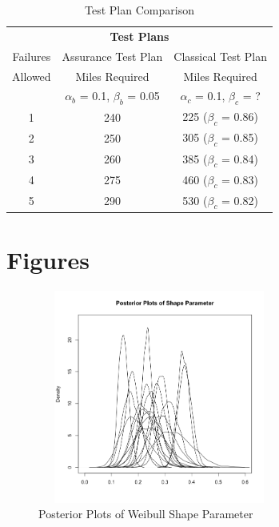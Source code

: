 \documentclass[12pt]{article}
\begin{document}
\begin{table}[H]
\center
\begin{tabular}{|c|c|c|}
\multicolumn{3}{c}{\textbf{Test Plans}} \\
\cline{1-3}
Failures & Assurance Test Plan & Classical Test Plan \\
Allowed & Miles Required & Miles Required \\
  & $\alpha_b$ = 0.1, $\beta_b$ = 0.05 & $\alpha_c$ = 0.1, $\beta_c$ = ? \\
\hline
1   & 240 & 225  ($\beta_c$ = 0.86) \\
2   & 250 & 305  ($\beta_c$ = 0.85) \\
3   & 260 & 385  ($\beta_c$ = 0.84) \\
4   & 275 & 460  ($\beta_c$ = 0.83) \\
5   & 290 & 530  ($\beta_c$ = 0.82) \\
\hline
\end{tabular}
\caption{Test Plan Comparison}
\label{table:ta}
\end{table}

\section{Figures}

\begin{figure}[h]
  \centering
      \includegraphics[width=8cm, height=7cm]{shapePostPlot}
  \caption{Posterior Plots of Weibull Shape Parameter}
  \label{Shape}
\end{figure}
\end{document}
